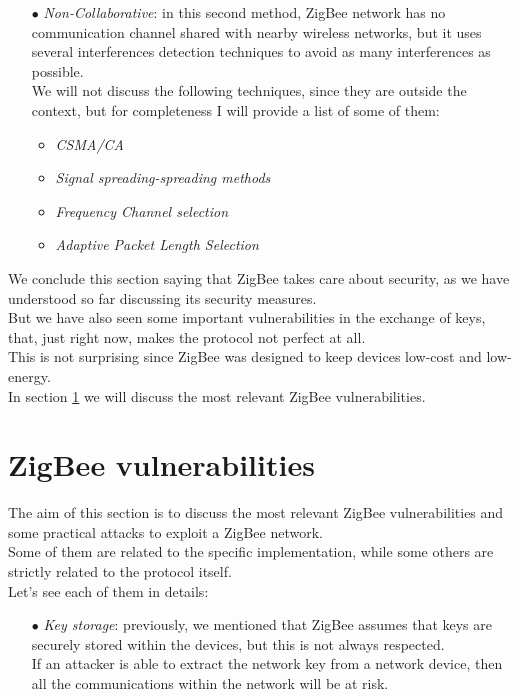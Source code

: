 \documentclass[12pt]{report}
\begin{document}
{\begin{itemize}
\item[$\bullet$] \emph{Non-Collaborative}: in this second method, ZigBee network has no communication channel shared with nearby wireless networks, but it uses several interferences detection techniques to avoid as many interferences as possible.\\
We will not discuss the following techniques, since they are outside the context, but for completeness I will provide a list of some of them:

\begin{itemize}
\setlength{\itemindent}{+4mm}
\item \emph{CSMA/CA}
\item \emph{Signal spreading-spreading methods}
\item \emph{Frequency Channel selection}
\item \emph{Adaptive Packet Length Selection}\\
\end{itemize}

\end{itemize}


We conclude this section saying that ZigBee takes care about security, as we have understood so far discussing its security measures.\\
But we have also seen some important vulnerabilities in the exchange of keys, that, just right now, makes the protocol not perfect at all.\\
This is not surprising since ZigBee was designed to keep devices low-cost and low-energy.\\

In section \ref{sec:zigbeevulns} we will discuss the most relevant ZigBee vulnerabilities.


\clearpage
\section{ZigBee vulnerabilities}
\label{sec:zigbeevulns}
\bigskip
The aim of this section is to discuss the most relevant ZigBee vulnerabilities and some practical attacks to exploit a ZigBee network.\\
Some of them are related to the specific implementation, while some others are strictly related to the protocol itself.\\
Let's see each of them in details:

\begin{itemize}
\setlength{\itemindent}{+4mm}
\item[$\bullet$] \emph{Key storage}: previously, we mentioned that ZigBee assumes that keys are securely stored within the devices, but this is not always respected.\\
If an attacker is able to extract the network key from a network device, then all the communications within the network will be at risk.


\end{itemize}}
\end{document}
